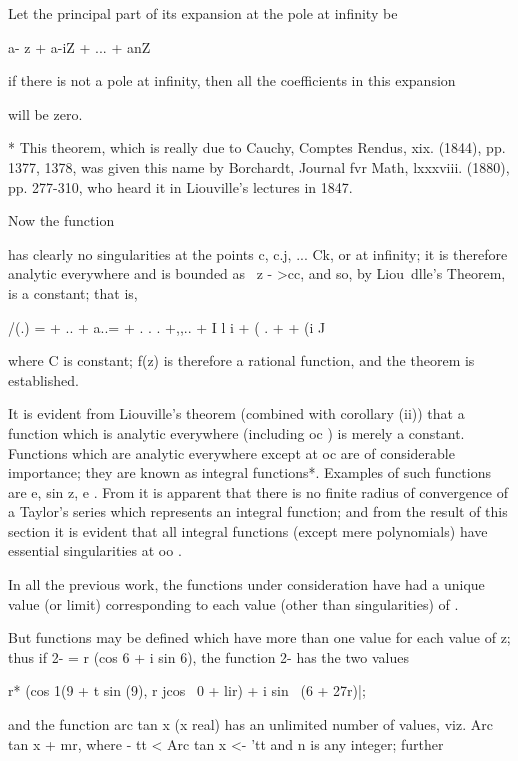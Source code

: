 {{{{Let the principal part of its expansion at the pole at infinity be

a- z + a-iZ + ... + anZ \

if there is not a pole at infinity, then all the coefficients in this
expansion

will be zero.

* This theorem, which is really due to Cauchy, Comptes Rendus, xix.
(1844), pp. 1377, 1378, was given this name by Borchardt, Journal fvr
Math, lxxxviii. (1880), pp. 277-310, who heard it in Liouville's
lectures in 1847.

%
%

Now the function

has clearly no singularities at the points c, c.j, ... Ck, or at
infinity; it is therefore analytic everywhere and is bounded as \ z -
>cc, and so, by Liou\ dlle's Theorem, is a constant; that is,

/(.) = + .. + a..= + . . . +,,.. + I l i + ( . +   + (i J

where C is constant; f(z) is therefore a rational function, and the
theorem is established.

It is evident from Liouville's theorem (combined with
 corollary (ii)) that a function which is
analytic everywhere (including oc ) is merely a constant. Functions
which are analytic everywhere except at oc are of considerable
importance; they are known as integral functions*. Examples of such
functions are e, sin z, e . From  it is apparent
that there is no finite radius of convergence of a Taylor's series
which represents an integral function; and from the result of this
section it is evident that all integral functions (except mere
polynomials) have essential singularities at oo .


In all the previous work, the functions under consideration have had a
unique value (or limit) corresponding to each value (other than
singularities) of .

But functions may be defined which have more than one value for each
value of z; thus if 2- = r (cos 6 + i sin 6), the function 2- has the
two values

r* (cos 1(9 + t sin (9), r jcos \ 0 + lir) + i sin \ (6 + 27r)|;

and the function arc tan x (x real) has an unlimited number of values,
viz. Arc tan x + mr, where - tt < Arc tan x <- 'tt and n is any
integer; further

}}}}
